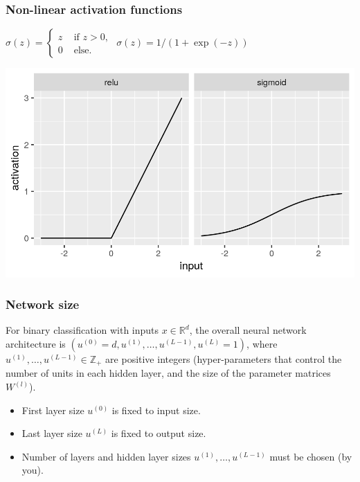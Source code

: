 \documentclass{beamer}
\begin{document}
\begin{frame}
  \frametitle{Non-linear activation functions}
$
\sigma(z)=
\begin{cases}
  z & \text{ if } z>0,\\
  0 & \text{ else.}
\end{cases}
$
  \hskip 1in
  $\sigma(z)=1/(1+\exp(-z))$

\includegraphics[width=\textwidth]{figure-activations}
\end{frame}

\begin{frame}
  \frametitle{Network size}
For binary classification
with inputs $x\in\mathbb R^d$, the overall neural network architecture
is $(u^{(0)}=d, u^{(1)}, \dots, u^{(L-1)}, u^{(L)}=1)$, where
$u^{(1)},\dots, u^{(L-1)}\in\mathbb Z_+$ are positive integers
(hyper-parameters that control the number of units in each hidden
layer, and the size of the parameter matrices $W^{(l)}$).
\begin{itemize}
\item First layer size $u^{(0)}$ is fixed to input size.
\item Last layer size $u^{(L)}$ is fixed to output size.
\item Number of layers and hidden layer sizes
  $u^{(1)},\dots, u^{(L-1)}$ must be chosen (by you).
\end{itemize}
\end{frame}
\end{document}
